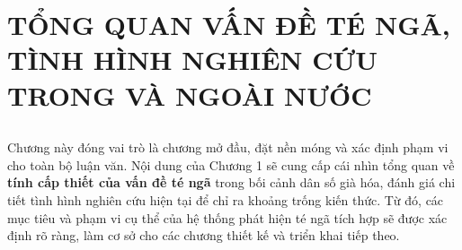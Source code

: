 \chapter[TỔNG QUAN VẤN ĐỀ TÉ NGÃ]{TỔNG QUAN VẤN ĐỀ TÉ NGÃ, TÌNH HÌNH NGHIÊN CỨU TRONG VÀ NGOÀI NƯỚC}
\label{chap:introduction} %

\section*{} %
Chương này đóng vai trò là chương mở đầu, đặt nền móng và xác định phạm vi cho toàn bộ luận văn. Nội dung của Chương 1 sẽ cung cấp cái nhìn tổng quan về \textbf{tính cấp thiết của vấn đề té ngã} trong bối cảnh dân số già hóa, đánh giá chi tiết tình hình nghiên cứu hiện tại để chỉ ra khoảng trống kiến thức. Từ đó, các mục tiêu và phạm vi cụ thể của hệ thống phát hiện té ngã tích hợp sẽ được xác định rõ ràng, làm cơ sở cho các chương thiết kế và triển khai tiếp theo.






